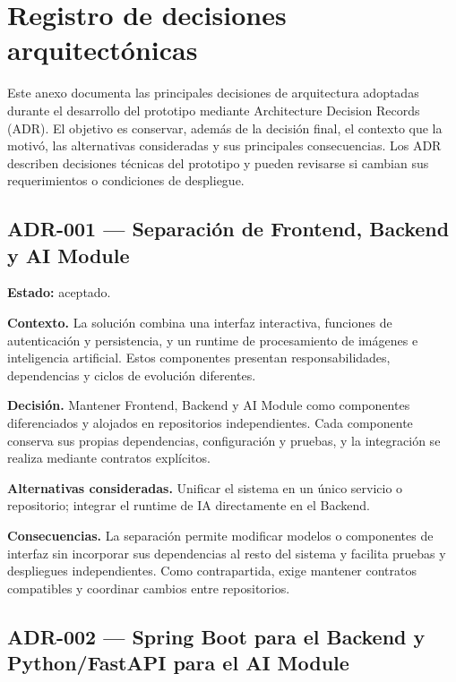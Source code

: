 \chapter{Registro de decisiones arquitectónicas}
\label{anexo:decisiones-arquitectonicas}

Este anexo documenta las principales decisiones de arquitectura adoptadas durante el desarrollo del prototipo mediante Architecture Decision Records (ADR). El objetivo es conservar, además de la decisión final, el contexto que la motivó, las alternativas consideradas y sus principales consecuencias. Los ADR describen decisiones técnicas del prototipo y pueden revisarse si cambian sus requerimientos o condiciones de despliegue.

\section*{ADR-001 --- Separación de Frontend, Backend y AI Module}
\label{adr:001-separacion-componentes}

\textbf{Estado:} aceptado.

\textbf{Contexto.} La solución combina una interfaz interactiva, funciones de autenticación y persistencia, y un runtime de procesamiento de imágenes e inteligencia artificial. Estos componentes presentan responsabilidades, dependencias y ciclos de evolución diferentes.

\textbf{Decisión.} Mantener Frontend, Backend y AI Module como componentes diferenciados y alojados en repositorios independientes. Cada componente conserva sus propias dependencias, configuración y pruebas, y la integración se realiza mediante contratos explícitos.

\textbf{Alternativas consideradas.} Unificar el sistema en un único servicio o repositorio; integrar el runtime de IA directamente en el Backend.

\textbf{Consecuencias.} La separación permite modificar modelos o componentes de interfaz sin incorporar sus dependencias al resto del sistema y facilita pruebas y despliegues independientes. Como contrapartida, exige mantener contratos compatibles y coordinar cambios entre repositorios.

\section*{ADR-002 --- Spring Boot para el Backend y Python/FastAPI para el AI Module}
\label{adr:002-spring-boot-fastapi}

